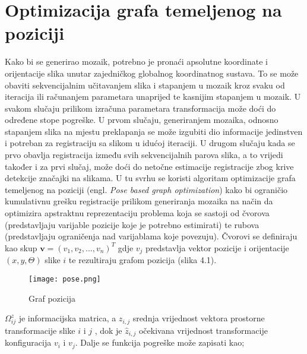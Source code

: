 \documentclass[times, utf8, diplomski]{fer}
\begin{document}
\chapter{Optimizacija grafa temeljenog na poziciji}
Kako bi se generirao mozaik, potrebno je pronaći apsolutne koordinate i orijentacije slika unutar zajedničkog globalnog koordinatnog sustava. To se može obaviti sekvencijalnim učitavanjem slika i stapanjem u mozaik kroz svaku od iteracija ili računanjem parametara unaprijed te kasnijim stapanjem u mozaik. U svakom slučaju prilikom izračuna parametara transformacija može doći do određene stope pogreške. U prvom slučaju, generiranjem mozaika, odnosno stapanjem slika na mjestu preklapanja se može izgubiti dio informacije jedinstven i potreban za registraciju sa slikom u idućoj iteraciji. U drugom slučaju kada se prvo obavlja registracija između svih sekvencijalnih parova slika, a to vrijedi također i za prvi slučaj, može doći do netočne estimacije registracije zbog krive detekcije značajki na slikama. U tu svrhu se koristi algoritam optimizacije grafa temeljenog na poziciji  (engl. \textit{Pose based graph optimization}) kako bi ograničio kumulativnu grešku registracije prilikom generiranja mozaika na način da optimizira apstraktnu reprezentaciju problema koja se sastoji od čvorova (predstavljaju varijable pozicije koje je potrebno estimirati) te rubova (predstavljaju ograničenja nad varijablama koje povezuju). Čvorovi se definiraju kao skup $ \textbf{v} = ( v_1,v_2 ,...,v_n )^T $ gdje $v_j$ predstavlja vektor  pozicije i orijentacije $(x,y,\Theta)$ slike $i$ te rezultiraju grafom pozicija (slika 4.1).
\begin{figure}[!tbh]
\centering
\texttt{[image: pose.png]}
		\caption{ Graf pozicija }
		\label{fig:Graf pozicija}
\end{figure}
\newpage
$\Omega_{ij}^z$ je informacijska matrica, a $z_{i,j}$ srednja vrijednost vektora prostorne transformacije slike $i$ i $j$ , dok je $\hat{z}_{i,j}$ očekivana vrijednost transformacije konfiguracija $v_i$ i $v_j$. Dalje se funkcija pogreške može zapisati kao;
\end{document}
